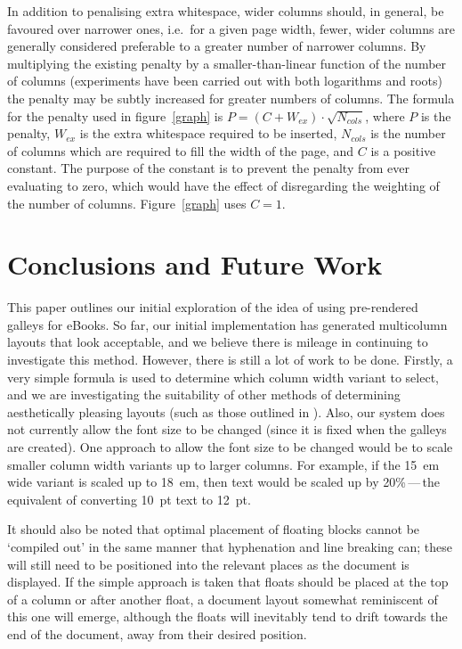 \documentclass{sig-alternate}
\begin{document}
In addition to penalising extra whitespace, wider columns should, in general, be favoured over narrower ones, i.e.~for a given page width, fewer, wider columns are generally considered preferable to a greater number of narrower columns. By multiplying the existing penalty by a smaller-than-linear function of the number of columns (experiments have been carried out with both logarithms and roots) the penalty may be subtly increased for greater numbers of columns. The formula for the penalty used in figure~\ref{graph} is $P = (C + W_{ex})\cdot\sqrt{N_{cols}}$, where $P$ is the penalty, $W_{ex}$ is the extra whitespace required to be inserted, $N_{cols}$ is the number of columns which are required to fill the width of the page, and $C$ is a positive constant. The purpose of the constant is to prevent the penalty from ever evaluating to zero, which would have the effect of disregarding the weighting of the number of columns. Figure~\ref{graph} uses $C=1$.


\section{Conclusions and Future Work}
This paper outlines our initial exploration of the idea of using pre-rendered galleys for eBooks. So far,  our initial implementation has generated multicolumn layouts that look acceptable, and we believe there is mileage in continuing to investigate this method. However, there is still a lot of work to be done. Firstly, a very simple formula is used to determine which column width variant to select, and we are investigating the suitability of other methods of determining aesthetically pleasing layouts (such as those outlined in \cite{Balinsky2009,Bringhurst2008,Goldenberg2002,Harrington2004,Johari1996,Purvis2003}). Also, our system does not currently allow the font size to be changed (since it is fixed when the galleys are created). One approach to allow the font size to be changed would be to scale smaller column width variants up to larger columns. For example, if the 15~em wide variant is scaled up to 18~em, then text would be scaled up by 20\%\,---\,the equivalent of converting 10~pt text to 12~pt.

It should also be noted that optimal placement of floating blocks cannot be `compiled out' in the same manner that hyphenation and line breaking can; these will still need to be positioned into the relevant places as the document is displayed. If the simple approach is taken that floats should be placed at the top of a column or after another float, a document layout somewhat reminiscent of this one will emerge, although the floats will inevitably tend to drift towards the end of the document, away from their desired position.
\end{document}
